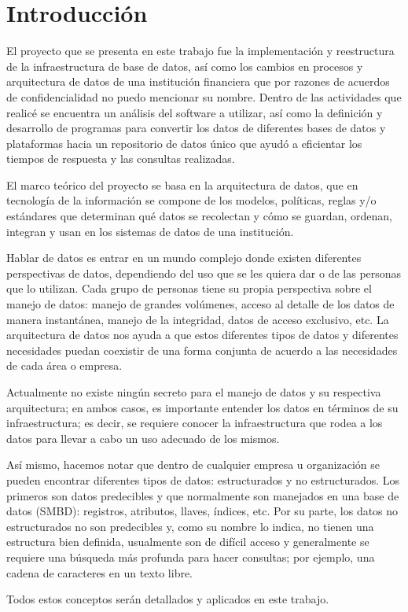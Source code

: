 \chapter{Introducción}
\label{cap:introduccion}

El proyecto que se presenta en este trabajo fue la implementación y reestructura
de la infraestructura de base de datos, así como los cambios en procesos y
arquitectura de datos de una institución financiera que por razones de acuerdos
de confidencialidad no puedo mencionar su nombre. Dentro de las actividades que
realicé se encuentra un análisis del software a utilizar, así como la definición
y desarrollo de programas para convertir los datos de diferentes bases de datos
y plataformas hacia un repositorio de datos único que ayudó a eficientar los
tiempos de respuesta y las consultas realizadas.

El marco teórico del proyecto se basa en la arquitectura de datos, que en
tecnología de la información se compone de los modelos, políticas, reglas y/o
estándares que determinan qué datos se recolectan y cómo se guardan, ordenan,
integran y usan en los sistemas de datos de una institución.

Hablar de datos es entrar en un mundo complejo donde existen diferentes
perspectivas de datos, dependiendo del uso que se les quiera dar o de las
personas que lo utilizan. Cada grupo de personas tiene su propia perspectiva
sobre el manejo de datos: manejo de grandes volúmenes, acceso al detalle de los
datos de manera instantánea, manejo de la integridad, datos de acceso exclusivo,
etc. La arquitectura de datos nos ayuda a que estos diferentes tipos de datos y
diferentes necesidades puedan coexistir de una forma conjunta de acuerdo a las
necesidades de cada área o empresa.

Actualmente no existe ningún secreto para el manejo de datos y su respectiva
arquitectura; en ambos casos, es importante entender los datos en términos de su
infraestructura; es decir, se requiere conocer la infraestructura que rodea a
los datos para llevar a cabo un uso adecuado de los mismos.

Así mismo, hacemos notar que dentro de cualquier empresa u organización se
pueden encontrar diferentes tipos de datos: estructurados y no
estructurados. Los primeros son datos predecibles y que normalmente son
manejados en una base de datos (SMBD): registros, atributos, llaves, índices,
etc. Por su parte, los datos no estructurados no son predecibles y, como su
nombre lo indica, no tienen una estructura bien definida, usualmente son de
difícil acceso y generalmente se requiere una búsqueda más profunda para hacer
consultas; por ejemplo, una cadena de caracteres en un texto libre.

Todos estos conceptos serán detallados y aplicados en este trabajo.

\cleardoublepage

